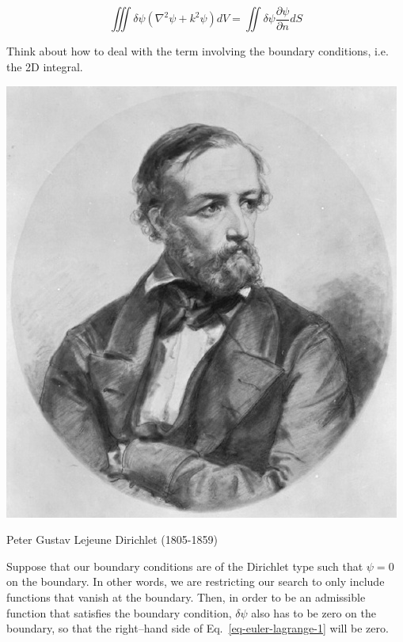 \begin{equation}
\iiint \delta \psi (\nabla^2 \psi + k^2 \psi ) dV = \iint \delta \psi  \frac{\partial \psi}{\partial n} dS \label{eq-euler-lagrange-1}
\end{equation}

\begin{cue}
Think about how to deal with the term involving the boundary conditions, i.e. the 2D integral.  
\end{cue}

\pagebreak

\begin{marginfigure}[0.2cm]
  \includegraphics{numeric/figures/p_dirichlet}
  \caption{Peter Gustav Lejeune Dirichlet (1805-1859)}
\end{marginfigure}

Suppose that our boundary conditions are of the Dirichlet type such that $\psi=0$ on the boundary. In other words, we are restricting our search to only include functions that vanish at the boundary. Then, in order to be an admissible function that satisfies the boundary condition, $\delta \psi$ also has to be zero on the boundary, so that the right--hand side of Eq.~\ref{eq-euler-lagrange-1} will be zero.

